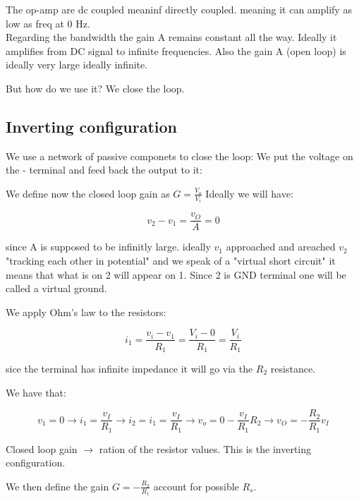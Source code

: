 \documentclass[../main.tex]{subfiles}
\begin{document}
The op-amp are dc coupled meaninf directly coupled. meaning it can amplify as low as freq at 0 Hz.\\

Regarding the bandwidth the gain A remains constant all the way. Ideally it amplifies from DC signal to infinite frequencies. Also the gain A (open loop) is ideally very large ideally infinite.

But how do we use it? We close the loop.


\subsection{Inverting configuration}

We use a network of passive componets to close the loop:
We put the voltage on the - terminal and feed back the output to it:


\vspace*{7cm}


We define now the closed loop gain as $G = \frac{V_o}{V_i}$
Ideally we will have:

\begin{equation}
	v_2 - v_1 = \frac{v_O}{A} = 0
\end{equation}

since A is supposed to be infinitly large.
ideally $v_1$ approached and areached $v_2$ "tracking each other in potential" and we speak of a "virtual short circuit" it means that what is on 2 will appear on 1. Since 2 is GND terminal one will be called a virtual ground.

We apply Ohm's law to the resistors:

\begin{equation}
	i_1 = \frac{v_i - v_1}{R_1} = \frac{V_i - 0}{R_1} = \frac{V_i}{R_1}
\end{equation}

sice the terminal has infinite impedance it will go via the $R_2$ resistance.

We have that:

\begin{equation}
	v_1 = 0 \rightarrow i_1 = \frac{v_I}{R_1} \rightarrow i_2 = i_1 = \frac{v_I}{R_1} \rightarrow v_o = 0 - \frac{v_I}{R_1} R_2 \rightarrow v_O = - \frac{R_2}{R_1} v_I
\end{equation}

Closed loop gain $\rightarrow$ ration of the resistor values. This is the inverting configuration.


We then define the gain $G = - \frac{R_2}{R_1}$ account for possible $R_s$.
\end{document}
